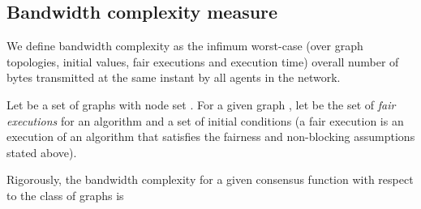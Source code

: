 \documentclass[letterpaper,10pt,conference]{ieeeconf}
\begin{document}
\subsection{Bandwidth complexity measure}
We define bandwidth complexity  as the infimum worst-case (over graph topologies, initial values, fair executions and execution time) overall number of bytes transmitted at the same instant by all agents in the network.

Let  be a set of graphs with node set . For a given graph , let  be the set of \emph{fair executions}  for an algorithm   and a set of initial conditions   (a fair execution is an execution of an algorithm that satisfies the fairness and non-blocking assumptions stated above).

Rigorously, the bandwidth complexity for a given consensus function  with respect to the class of graphs  is
\end{document}
